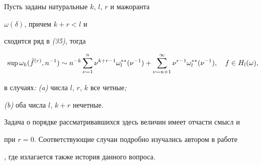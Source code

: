 \begin{thm}


Пусть заданы натуральные $k$, $l$, $r$ и мажоранта


$\omega(\delta)$, причем $k+r< l$ и


сходится ряд в {\em (35)}, тогда


\begin{equation}


\sup\omega_k(\Tilde f^{(r)},n^{-1})\sim n^{-k}


\sum^n_{\nu=1}\nu^{k+r-1}\omega^{**}_l(\nu^{-1})+


\sum^\infty_{\nu=n+1}\nu^{r-1}\omega^{**}_l(\nu^{-1}), \quad


f\in H_l(\omega),


\end{equation}


в случаях{\em :} {\em (a)} числа $l$, $r$, $k$ все четные{\em ;}


{\em (b)} оба числа $l$, $k+r$ нечетные.


\end{thm}





\begin{notenonum}


Задача о порядке рассматривавшихся здесь величин имеет отчасти смысл и


при $r=0$. Соответствующие случаи подробно изучались автором в работе


\cite{Ge2}, где излагается также история данного вопроса.


\end{notenonum}








